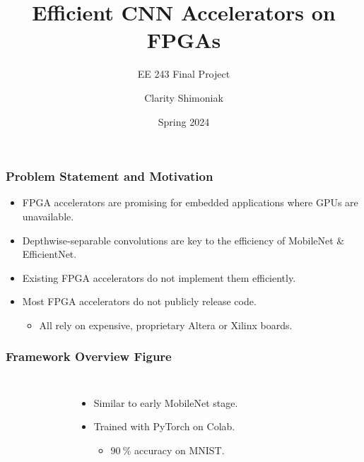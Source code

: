 \documentclass[english]{beamer}
\begin{document}
\title{Efficient CNN Accelerators on FPGAs}
\subtitle{EE 243 Final Project}
\author{Clarity Shimoniak}
\date{Spring 2024}
\frame{\titlepage}


\begin{frame}
\frametitle{Problem Statement and Motivation}
\begin{itemize}
	\item FPGA accelerators are promising for embedded applications where GPUs
	are unavailable.
	\item Depthwise-separable convolutions are key to the efficiency of
	MobileNet\supercites{mobilenetv1}{mobilenetv2} \&
	EfficientNet\supercite{efficientnet}.
	\item Existing FPGA accelerators do not implement them efficiently.
	\item Most FPGA accelerators do not publicly release code.
	\begin{itemize}
		\item All rely on expensive, proprietary Altera or Xilinx boards.
	\end{itemize}
\end{itemize}
\end{frame}


\begin{frame}
\frametitle{Framework Overview Figure}
	\begin{columns}
		\begin{figure}
			\centering
		\end{figure}
		\begin{itemize}
			\item Similar to early MobileNet stage.
			\item Trained with PyTorch on Colab.
			\begin{itemize}
				\item $\SI{90}{\percent}$ accuracy on MNIST.
			\end{itemize}
		\end{itemize}
	\end{columns}
\end{frame}
\end{document}
